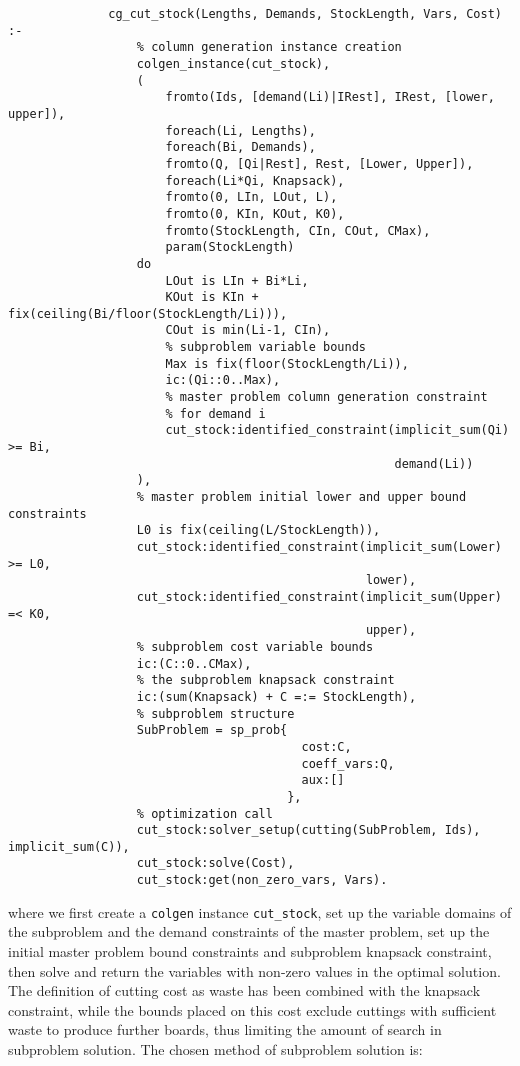 \begin{verbatim}
              cg_cut_stock(Lengths, Demands, StockLength, Vars, Cost) :-
                  % column generation instance creation
                  colgen_instance(cut_stock),
                  (
                      fromto(Ids, [demand(Li)|IRest], IRest, [lower, upper]),
                      foreach(Li, Lengths),
                      foreach(Bi, Demands),
                      fromto(Q, [Qi|Rest], Rest, [Lower, Upper]),
                      foreach(Li*Qi, Knapsack),
                      fromto(0, LIn, LOut, L),
                      fromto(0, KIn, KOut, K0),
                      fromto(StockLength, CIn, COut, CMax),
                      param(StockLength)
                  do
                      LOut is LIn + Bi*Li,
                      KOut is KIn + fix(ceiling(Bi/floor(StockLength/Li))),
                      COut is min(Li-1, CIn),
                      % subproblem variable bounds
                      Max is fix(floor(StockLength/Li)),
                      ic:(Qi::0..Max),
                      % master problem column generation constraint
                      % for demand i
                      cut_stock:identified_constraint(implicit_sum(Qi) >= Bi,
                                                      demand(Li))
                  ),
                  % master problem initial lower and upper bound constraints
                  L0 is fix(ceiling(L/StockLength)),
                  cut_stock:identified_constraint(implicit_sum(Lower) >= L0,
                                                  lower),
                  cut_stock:identified_constraint(implicit_sum(Upper) =< K0,
                                                  upper),
                  % subproblem cost variable bounds
                  ic:(C::0..CMax),
                  % the subproblem knapsack constraint
                  ic:(sum(Knapsack) + C =:= StockLength),
                  % subproblem structure
                  SubProblem = sp_prob{
                                         cost:C,
                                         coeff_vars:Q,
                                         aux:[]
                                       },
                  % optimization call
                  cut_stock:solver_setup(cutting(SubProblem, Ids), implicit_sum(C)),
                  cut_stock:solve(Cost),
                  cut_stock:get(non_zero_vars, Vars).
\end{verbatim}
where we first create a {\tt colgen} instance {\tt cut\_stock}, set up the variable domains of the subproblem and the demand constraints of the master problem, set up the initial master problem bound constraints and subproblem knapsack constraint, then solve and return the variables with non-zero values in the optimal solution. The definition of cutting cost as waste has been combined with the knapsack constraint, while the bounds placed on this cost exclude cuttings with sufficient waste to produce further boards, thus limiting the amount of search in subproblem solution. The chosen method of subproblem solution is:
